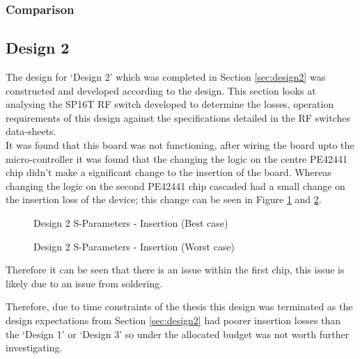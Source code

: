 \documentclass[12pt,openany,a4paper]{book}
\begin{document}



\subsubsection{Comparison}









\subsection{Design 2}
The design for `Design 2' which was completed in Section \ref{sec:design2} was constructed and developed according to the design. This section looks at analysing the SP16T RF switch developed to determine the losses, operation requirements of this design against the specifications detailed in the RF switches data-sheets. \\[0.2cm]
It was found that this board was not functioning, after wiring the board upto the micro-controller it was found that the changing the logic on the centre PE42441 chip didn't make a significant change to the insertion of the board. Whereas changing the logic on the second PE42441 chip cascaded had a small change on the insertion loss of the device; this change can be seen in Figure \ref{fig:design2_1} and \ref{fig:design2_2}.
\begin{figure}[H]
	\centering
	\caption{Design 2 S-Parameters - Insertion (Best case)}
	\label{fig:design2_1}
\end{figure} 
\begin{figure}[H]
	\centering
	\caption{Design 2 S-Parameters - Insertion (Worst case)}
	\label{fig:design2_2}
\end{figure} 
Therefore it can be seen that there is an issue within the first chip, this issue is likely due to an issue from soldering. 

Therefore, due to time constraints of the thesis this design was terminated as the design expectations from Section \ref{sec:design2} had poorer insertion losses than the `Design 1' or `Design 3' so under the allocated budget was not worth further investigating.   
\end{document}
